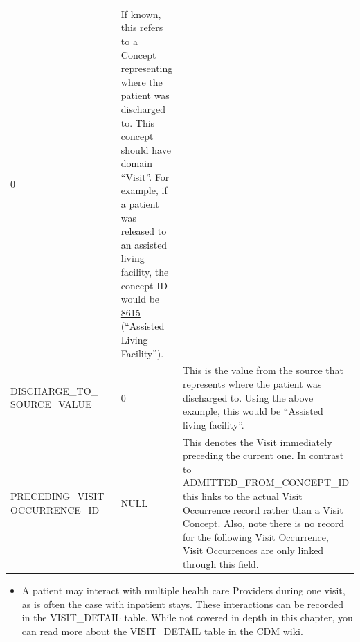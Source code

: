 \documentclass[11pt]{book}
\providecommand{\tightlist}{%
  \setlength{\itemsep}{0pt}\setlength{\parskip}{0pt}}
\theoremstyle{definition}
\theoremstyle{definition}
\theoremstyle{definition}
\theoremstyle{remark}
\begin{document}
\begin{longtable}[]{@{}lll@{}}
\begin{minipage}[t]{0.15\columnwidth}
0\strut
\end{minipage} & \begin{minipage}[t]{0.49\columnwidth}\raggedright
If known, this refers to a Concept representing where the patient was discharged to. This concept should have domain ``Visit''. For example, if a patient was released to an assisted living facility, the concept ID would be \href{http://athena.ohdsi.org/search-terms/terms/8615}{8615} (``Assisted Living Facility'').\strut
\end{minipage}\tabularnewline
\begin{minipage}[t]{0.28\columnwidth}\raggedright
DISCHARGE\_TO\_ SOURCE\_VALUE\strut
\end{minipage} & \begin{minipage}[t]{0.15\columnwidth}\raggedright
0\strut
\end{minipage} & \begin{minipage}[t]{0.49\columnwidth}\raggedright
This is the value from the source that represents where the patient was discharged to. Using the above example, this would be ``Assisted living facility''.\strut
\end{minipage}\tabularnewline
\begin{minipage}[t]{0.28\columnwidth}\raggedright
PRECEDING\_VISIT\_ OCCURRENCE\_ID\strut
\end{minipage} & \begin{minipage}[t]{0.15\columnwidth}\raggedright
NULL\strut
\end{minipage} & \begin{minipage}[t]{0.49\columnwidth}\raggedright
This denotes the Visit immediately preceding the current one. In contrast to ADMITTED\_FROM\_CONCEPT\_ID this links to the actual Visit Occurrence record rather than a Visit Concept. Also, note there is no record for the following Visit Occurrence, Visit Occurrences are only linked through this field.\strut
\end{minipage}\tabularnewline
\bottomrule
\end{longtable}

\begin{itemize}
\tightlist
\item
  A patient may interact with multiple health care Providers during one visit, as is often the case with inpatient stays. These interactions can be recorded in the VISIT\_DETAIL table. While not covered in depth in this chapter, you can read more about the VISIT\_DETAIL table in the \href{https://github.com/OHDSI/CommonDataModel/wiki/VISIT_DETAIL}{CDM wiki}.
\end{itemize}
\end{document}
